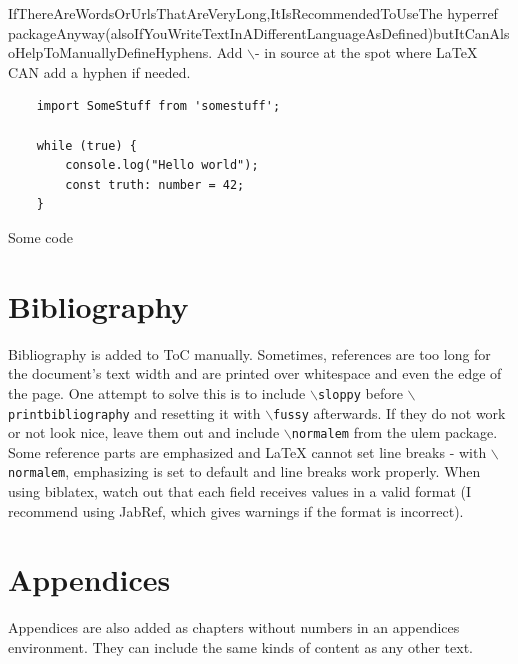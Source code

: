 IfThereAreWordsOrUrlsThatAreVeryLong,ItIsRecommendedToUseThe hyperref packageAnyway(alsoIfYouWriteTextInADifferentLa\-nguageAsDefined)butI\-tCanAlsoHelpToManuallyDefineHyphens. Add $\backslash$- in source at the spot where LaTeX CAN add a hyphen if needed.
\\
%
\newpage

\begin{code}
	\begin{verbatim}
	import SomeStuff from 'somestuff';

	while (true) {
		console.log("Hello world");
		const truth: number = 42;
	}
	\end{verbatim}
	\caption{Some code}
	\label{code:some-example-code}
\end{code}

%
\section{Bibliography}
%
Bibliography is added to ToC manually. Sometimes, references are too long for the document's text width and are printed over whitespace and even the edge of the page. One attempt to solve this is to include \texttt{$\backslash$sloppy} before \texttt{$\backslash$printbibliography} and resetting it with \texttt{$\backslash$fussy} afterwards. If they do not work or not look nice, leave them out and include \texttt{$\backslash$normalem} from the ulem package. Some reference parts are emphasized and LaTeX cannot set line breaks - with \texttt{$\backslash$normalem}, emphasizing is set to default and line breaks work properly. When using biblatex, watch out that each field receives values in a valid format (I recommend using JabRef, which gives warnings if the format is incorrect).
%
\section{Appendices}
%
Appendices are also added as chapters without numbers in an appendices environment. They can include the same kinds of content as any other text.
%